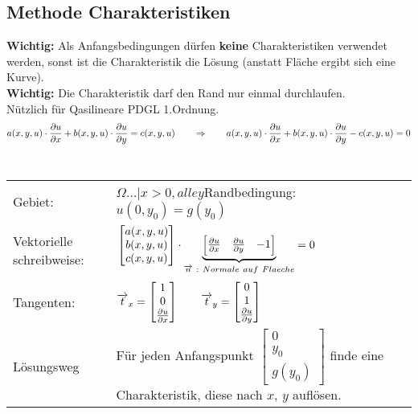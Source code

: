 \subsection{Methode Charakteristiken}
\textbf{Wichtig:} Als Anfangsbedingungen dürfen \textbf{keine} Charakteristiken verwendet werden, sonst ist die Charakteristik die Lösung (anstatt Fläche ergibt sich eine Kurve).\\
\textbf{Wichtig:} Die Charakteristik darf den Rand nur einmal durchlaufen.\\
Nützlich für Qasilineare PDGL 1.Ordnung.\\
$$a(x,y,u)\cdot\frac{\partial u}{\partial x}+b(x,y,u)\cdot\frac{\partial u}{\partial y}=c(x,y,u) \qquad\Rightarrow\qquad a(x,y,u)\cdot\frac{\partial u}{\partial x}+b(x,y,u)\cdot\frac{\partial u}{\partial y}-c(x,y,u)=0$$\\


\begin{tabular}{ll}
Gebiet:& $\Omega{\ldots|x>0,alle y}$\qquad Randbedingung: $u(0,y_0)=g(y_0)$\\
Vektorielle schreibweise:& $\begin{bmatrix}
	a(x,y,u)\\ b(x,y,u)\\ c(x,y,u)
\end{bmatrix}\cdot 
\underset{\overrightarrow{n}~:~Normale ~auf~ Flaeche}{\underbrace{\begin{bmatrix}
\frac{\partial u}{\partial x} & \frac{\partial u}{\partial y} & -1
\end{bmatrix}}}=0$\\[1cm]
Tangenten:& $\overrightarrow{t}_x=\begin{bmatrix}1\\0\\ \frac{\partial u}{\partial x}\end{bmatrix}\qquad 
			\overrightarrow{t}_y=\begin{bmatrix}0\\1\\ \frac{\partial u}{\partial y}\end{bmatrix}$\\[1cm]
Lösungsweg& Für jeden Anfangspunkt $\begin{bmatrix} 0\\y_0\\g(y_0)\end{bmatrix}$ finde eine Charakteristik, diese nach $x$, $y$ auflösen.
\end{tabular}

